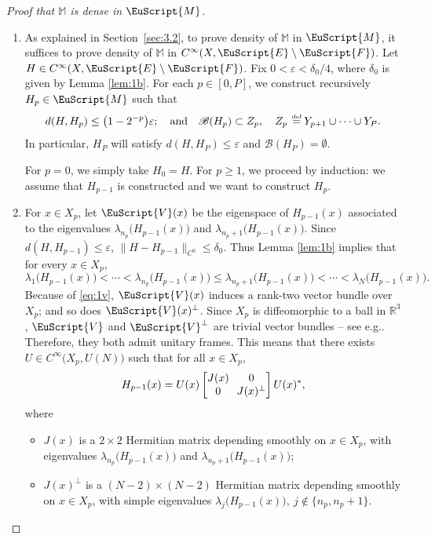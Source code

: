 \documentclass[10pt]{amsart}
\let\mathcal\mathscr
\let\pazocal\EuScript
\theoremstyle{definition}
\newcommand{\FF}{\pazocal{F}}
\newcommand{\VV}{{\pazocal{V}}}
\newcommand{\EE}{\pazocal{E}}
\newcommand{\MM}{\pazocal{M}}
\newcommand{\BB}{\mathcal{B}}
\newcommand{\R}{\mathbb{R}}
\newcommand{\Mm}{\mathbb{M}}
\let\epsi\varepsilon
\newcommand{\matrice}[1]{\arraycolsep3.5pt\begin{bmatrix}#1\end{bmatrix}}
\newcommand{\de}{\,\mathrel{\stackrel{\makebox[0pt]{\mbox{\normalfont\tiny def}}}{=}}}
\providecommand{\skpt}{\par\smallskip\noindent}
\providecommand{\eg}{e.g.}\providecommand{\ie}{i.e.}\providecommand{\etc}{etc.}\providecommand{\resp}{resp.}\providecommand{\cf}{cf.}
\begin{document}
\skpt
\begin{proof}[Proof that $\Mm$ is dense in $\MM$]
\begin{enumerate}
\item
As explained in Section~\ref{sec:3.2}, to prove density of $\Mm$ in $\MM$, it suffices to prove density of $\Mm$ in $C^\infty(X,\EE \setminus \FF)$. Let $H \in C^\infty(X,\EE \setminus \FF)$.
Fix $0 < \epsi < \delta_0/4$, where $\delta_0$ is given by Lemma \ref{lem:1b}. For each $p \in [0,P]$, we construct recursively $H_p \in \MM$ such that
\begin{equation*}
d(H, H_p) \leq \bigl(1-2^{-p}\bigr) \epsi ; \quad\text{and}\quad \BB(H_p) \subset Z_p, \quad Z_p \de Y_{p+1} \cup \dots \cup Y_P.
\end{equation*}
In particular, $H_P$ will satisfy $d(H,H_P) \leq \epsi$ and $\BB(H_P) = \emptyset$.

For $p=0$, we simply take $H_0 = H$. For $p \geq 1$, we proceed by induction: we assume that $H_{p-1}$ is constructed and we want to construct $H_p$.

\item
For $x \in X_p$, let $\VV(x)$ be the eigenspace of $H_{p-1}(x)$ associated to the eigenvalues $\lambda_{n_p}\bigl( H_{p-1}(x) \bigr)$ and $\lambda_{n_p+1}\bigl( H_{p-1}(x) \bigr)$. Since $d(H, H_{p-1}) \leq \epsi$, $\| H-H_{p-1}\|_{C^0} \leq \delta_0$. Thus Lemma \ref{lem:1b} implies that for every $x \in X_p$,
\begin{equation}\label{eq:1v}
\lambda_1\bigl( H_{p-1}(x) \bigr) \!<\! \cdots \!<\! \lambda_{n_p}\bigl( H_{p-1}(x) \bigr) \!\leq\! \lambda_{n_p+1}\bigl( H_{p-1}(x) \bigr) \!<\! \cdots \!<\! \lambda_N\bigl( H_{p-1}(x) \bigr).
\end{equation}
Because of \eqref{eq:1v}, $\VV(x)$ induces a rank-two vector bundle over $X_p$; and so does $\VV(x)^\perp$. Since $X_p$ is diffeomorphic to a ball in $\R^3$, $\VV$ and $\VV^\perp$ are trivial vector bundles -- see \eg \cite[\S1.3]{M01}. Therefore, they both admit unitary frames. This means that there exists $U \in C^\infty\bigl(X_p,U(N)\bigr)$ such that for all $x \in X_p$,
\begin{equation}\label{eq:1u}
H_{p-1}(x) = U(x) \matrice{J(x) & 0 \\ 0 & J(x)^\perp} U(x)^*,
\end{equation}
where
\begin{itemize}
\item $J(x)$ is a $2 \times 2$ Hermitian matrix depending smoothly on $x \in X_p$, with eigenvalues $\lambda_{n_p}\bigl( H_{p-1}(x) \bigr)$ and $\lambda_{n_p+1}\bigl( H_{p-1}(x) \bigr)$;
\item $J(x)^\perp$ is a $(N-2) \times (N-2)$ Hermitian matrix depending smoothly on $x \in X_p$, with simple eigenvalues $\lambda_j\bigl( H_{p-1}(x) \bigr), \ j \notin\{ n_p, n_p+1\}$.
\end{itemize}


\end{enumerate}
\end{proof}
\end{document}
